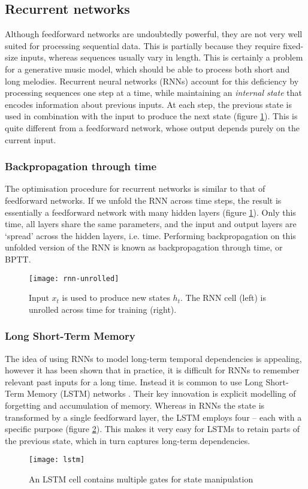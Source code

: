 \documentclass[../../report.tex]{subfiles}
\begin{document}
\subsection{Recurrent networks}

Although feedforward networks are undoubtedly powerful, they are not very well
suited for processing sequential data. This is partially because they require
fixed-size inputs, whereas sequences usually vary in length. This is certainly a
problem for a generative music model, which should be able to process both short
and long melodies. Recurrent neural networks (RNNs) account for this deficiency
by processing sequences one step at a time, while maintaining an \emph{internal
state} that encodes information about previous inputs. At each step, the
previous state is used in combination with the input to produce the next state
(figure \ref{fig:rnn-unrolled}). This is quite different from a feedforward
network, whose output depends purely on the current input.

\subsubsection{Backpropagation through time}
The optimisation procedure for recurrent networks is similar to that of
feedforward networks. If we unfold the RNN across time steps, the result is
essentially a feedforward network with many\footnotemark{} hidden layers (figure
\ref{fig:rnn-unrolled}). Only this time, all layers share the same parameters,
and the input and output layers are `spread' across the hidden layers, i.e.
time. Performing backpropagation on this unfolded version of the RNN is known as
backpropagation through time, or BPTT.


\begin{figure}
  \centering
  \texttt{[image: rnn-unrolled]}
  \caption{Input \(x_t\) is used to produce new states \(h_t\). The RNN cell
  (left) is unrolled across time for training (right). \cite{Olah2015LSTM}}
  \label{fig:rnn-unrolled}
\end{figure}

\subsubsection{Long Short-Term Memory}
The idea of using RNNs to model long-term temporal dependencies is appealing,
however it has been shown \cite{Bengio1994} that in practice, it is difficult
for RNNs to remember relevant past inputs for a long time. Instead it is common
to use Long Short-Term Memory (LSTM) networks \cite{Hochreiter1997}. Their key
innovation is explicit modelling of forgetting and accumulation of memory.
Whereas in RNNs the state is transformed by a single feedforward layer, the LSTM
employs four -- each with a specific purpose (figure \ref{fig:lstm}). This makes
it very easy for LSTMs to retain parts of the previous state, which in turn
captures long-term dependencies.

\begin{figure}
  \centering
  \texttt{[image: lstm]}
  \caption{An LSTM cell contains multiple gates for state manipulation \cite{Olah2015LSTM}}
  \label{fig:lstm}
\end{figure}
\end{document}

